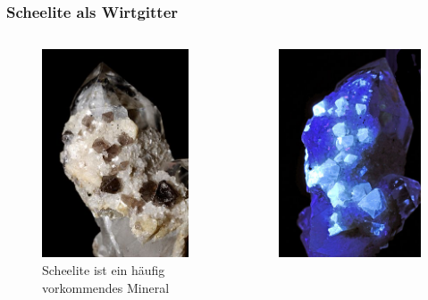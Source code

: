 \documentclass{beamer}
\begin{document}
\begin{frame}[t]\frametitle{Scheelite  als Wirtgitter}
     \begin{columns}
              \begin{figure}[!h]
\centering
      \includegraphics{scheelitesurquarz.jpg}
      \caption*{\footnotesize Scheelite ist ein häufig vorkommendes Mineral}
 \end{figure}
  
 \begin{figure}[!h]
\centering
      \includegraphics{scheelitesurquarz2.jpg}
     

\end{figure}
\end{columns}
\end{frame}
\end{document}
